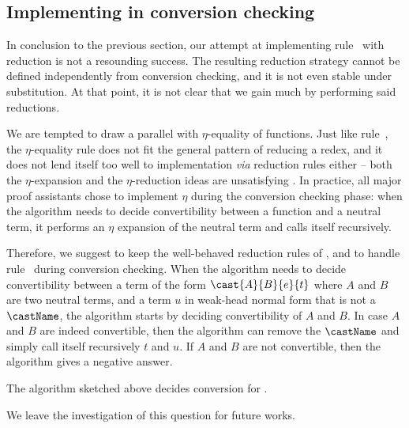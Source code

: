 \subsection{Implementing  in conversion checking}

In conclusion to the previous section, our attempt at implementing 
rule~ with reduction is not a resounding 
success.
% 
The resulting reduction strategy cannot be defined independently from 
conversion checking, and it is not even stable under substitution.
% 
At that point, it is not clear that we gain much by performing said reductions.

We are tempted to draw a parallel with \( \eta \)-equality of functions. 
% 
Just like rule~, the \( \eta \)-equality rule 
does not fit the general pattern of reducing a redex, and it does not lend 
itself too well to implementation \textit{via} reduction rules either -- both the
\( \eta \)-expansion and the \( \eta \)-reduction ideas are unsatisfying
.
% 
In practice, all major proof assistants chose to implement \( \eta \) during 
the conversion checking phase: when the algorithm needs to decide 
convertibility between a function and a neutral term, it performs an \( \eta \)
expansion of the neutral term and calls itself recursively.

Therefore, we suggest to keep the well-behaved reduction rules of \SetoidCC,
and to handle rule~ during conversion checking.
% 
When the algorithm needs to decide convertibility between a term of the form 
\( \cast{A}{B}{e}{t} \) where \( A \) and \( B \) are two neutral terms, and a
term \( u \) in weak-head normal form that is not a \( \castName \), the 
algorithm starts by deciding convertibility of \( A \) and \( B \). 
% 
In case \( A \) and \( B \) are indeed convertible, then the algorithm can 
remove the \( \castName \) and simply call itself recursively \( t \) and 
\( u \).
% 
If \( A \) and \( B \) are not convertible, then the algorithm gives a negative 
answer.

\begin{conjecture}
  The algorithm sketched above decides conversion for \SetoidCCplus.
\end{conjecture}

We leave the investigation of this question for future works.

